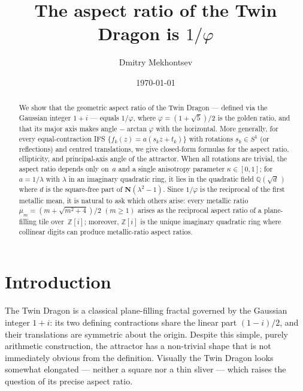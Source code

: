 \documentclass{amsart}
\title{The aspect ratio of the Twin Dragon is $1/\varphi$}
\author{Dmitry Mekhontsev}
\date{\today}
\theoremstyle{definition}
\theoremstyle{remark}
\begin{document}
\begin{abstract}
We show that the geometric aspect ratio of the Twin Dragon
--- defined via the Gaussian integer $1+i$ ---
equals $1/\varphi$, where $\varphi=(1+\sqrt{5})/2$ is the golden ratio,
and that its major axis makes angle $-\arctan\varphi$ with the horizontal.
More generally, for every equal-contraction IFS
$\{f_k(z)=a(s_k z+t_k)\}$ with rotations $s_k\in S^1$
(or reflections) and centred translations,
we give closed-form formulas for the aspect ratio, ellipticity, and
principal-axis angle of the attractor.
When all rotations are trivial, the aspect ratio depends only on~$a$
and a single anisotropy parameter $\kappa\in[0,1]$;
for $a=1/\lambda$ with $\lambda$ in an imaginary quadratic ring,
it lies in the quadratic field $\mathbb{Q}(\sqrt{d}\,)$
where $d$ is the square-free part of $\mathbf{N}(\lambda^2\!-\!1)$.
Since $1/\varphi$ is the reciprocal of the first metallic mean, it is natural to ask
which others arise: every metallic ratio
$\mu_m=(m+\sqrt{m^2+4})/2$ $(m\geq 1)$
arises as the reciprocal aspect ratio of a plane-filling tile
over~$\mathbb{Z}[i]$;
moreover, $\mathbb{Z}[i]$ is the unique imaginary quadratic ring
where collinear digits can produce metallic-ratio aspect ratios.
\end{abstract}

\maketitle

\section{Introduction}

The Twin Dragon is a classical plane-filling fractal \cite{DavisKnuth1970} governed
by the Gaussian integer $1+i$: its two defining contractions share the linear part
$(1-i)/2$, and their translations are symmetric about the origin.
Despite this simple, purely arithmetic construction, the attractor has a non-trivial
shape that is not immediately obvious from the definition.
Visually the Twin Dragon looks somewhat elongated --- neither a square nor a thin
sliver --- which raises the question of its precise aspect ratio.
\end{document}
